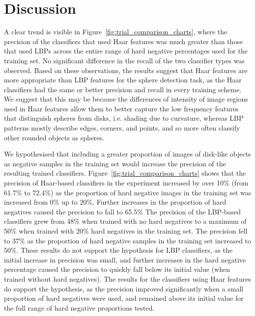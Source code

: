 \documentclass{sig-alternate-05-2015}
\begin{document}
	\section{Discussion} {


		A clear trend is visible in Figure~\ref{fig:trial_comparison_charts}, where the precision of the classifiers that used Haar features was much greater than those that used LBPs across the entire range of hard negative percentages used for the training set.
    No significant difference in the recall of the two classifier types was observed.
    Based on these observations, the results suggest that Haar features are more appropriate than LBP features for the sphere detection task, as the Haar classifiers had the same or better precision and recall in every training scheme.
		We suggest that this may be because the differences of intensity of image regions used in Haar features allow them to better capture the low frequency features that distinguish spheres from disks, i.e. shading due to curvature, whereas LBP patterns mostly describe edges, corners, and points, and so more often classify other rounded objects as spheres.


		We hypothesised that including a greater proportion of images of disk-like objects as negative samples in the training set would increase the precision of the resulting trained classifiers.
    Figure~\ref{fig:trial_comparison_charts} shows that the precision of Haar-based classifiers in the experiment increased by over 10\% (from 61.7\% to 72.4\%) as the proportion of hard negative images in the training set was increased from 0\% up to 20\%. Further increases in the proportion of hard negatives caused the precision to fall to 65.5\%
    The precision of the LBP-based classifiers grew from 48\% when trained with no hard negatives to a maximum of 50\% when trained with 20\% hard negatives in the training set. The precision fell to 37\% as the proportion of hard negative samples in the training set increased to 50\%.
    These results do not support the hypothesis for LBP classifiers, as the initial increase in precision was small, and further increases in the hard negative percentage caused the precision to quickly fall below its initial value (when trained without hard negatives).
    The results for the classifiers using Haar features do support the hypothesis, as the precision improved significantly when a small proportion of hard negatives were used, and remained above its initial value for the full range of hard negative proportions tested.

}
\end{document}
